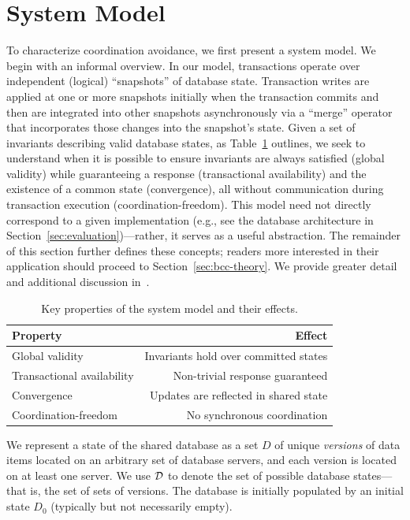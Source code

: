 
\section{System Model}
\label{sec:model}

To characterize coordination avoidance, we first present a system
model. We begin with an informal overview. In our model, transactions
operate over independent (logical) ``snapshots'' of database
state. Transaction writes are applied at one or more snapshots
initially when the transaction commits and then are integrated into
other snapshots asynchronously via a ``merge'' operator that
incorporates those changes into the snapshot's state. Given a set of
invariants describing valid database states, as
Table~\ref{table:requirements} outlines, we seek to understand when it
is possible to ensure invariants are always satisfied (global
validity) while guaranteeing a response (transactional availability)
and the existence of a common state (convergence), all without
communication during transaction execution
(coordination-freedom). This model need not directly correspond
to a given implementation (e.g., see the database architecture in
Section~\ref{sec:evaluation})---rather, it serves as a useful
abstraction.  The remainder of this section
further defines these concepts; readers more interested in their
application should proceed to Section~\ref{sec:bcc-theory}. We provide
greater detail and additional discussion in~\cite{ca-extended}.

\begin{table}[t]
\begin{center}
\small
\begin{tabular}{|l|r|}
  \hline\textbf{Property} & \textbf{Effect}  \\\hline
  Global validity & Invariants hold over committed states  \\
  Transactional availability & Non-trivial response guaranteed \\
  Convergence & Updates are reflected in shared state \\
  Coordination-freedom & No synchronous coordination\\\hline
\end{tabular}
\end{center}\vspace{-1em}
\caption{Key properties of the system model and their effects.}
\label{table:requirements}
\end{table}

 We represent a state of the shared database as a
set $D$ of unique \textit{versions} of data items located on an arbitrary set of
database servers, and each version is located on at least one
server. We use ${\cal D}$ to denote the set of possible database
states---that is, the set of sets of versions. The database is
initially populated by an initial state $D_0$ (typically but not
necessarily empty).

